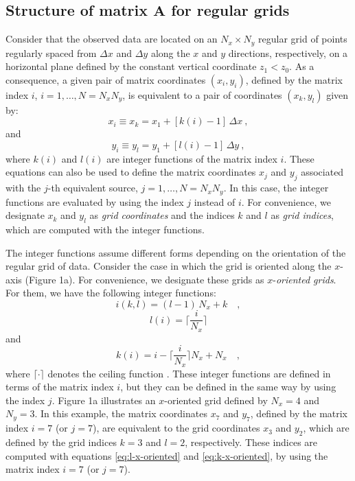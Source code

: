 \documentclass[manuscript,revised]{geophysics}
\begin{document}
\subsection{Structure of matrix $\mathbf{A}$ for regular grids}

Consider that the observed data are located on an $N_{x} \times N_{y}$ regular grid of
points regularly spaced from $\Delta x$ and $\Delta y$ along the $x$ and $y$ directions,
respectively, on a horizontal plane defined by the constant vertical coordinate $z_{1} < z_{0}$. 
As a consequence, a given pair of matrix coordinates $(x_{i}, y_{i})$, defined by the matrix index 
$i$, $i = 1, \dots, N = N_{x} N_{y}$, is equivalent to a pair of coordinates $(x_{k}, y_{l})$
given by:
\begin{equation}
x_{i} \equiv x_{k} = x_{1} + \left[ k(i) - 1 \right] \, \Delta x \: , 
\label{eq:xi}
\end{equation}
and
\begin{equation}
y_{i} \equiv y_{l} = y_{1} + \left[ l(i) - 1 \right] \, \Delta y \: ,
\label{eq:yi}
\end{equation}
where $k(i)$ and $l(i)$ are integer functions of the matrix index $i$.
These equations can also be used to define the matrix coordinates 
$x_{j}$ and $y_{j}$ associated with the $j$-th equivalent source,
$j = 1, \dots, N = N_{x}N_{y}$. In this case, the integer functions
are evaluated by using the index $j$ instead of $i$.
For convenience, we designate $x_{k}$ and $y_{l}$ as \textit{grid coordinates}
and the indices $k$ and $l$ as \textit{grid indices}, which are computed with
the integer functions.

The integer functions assume different forms depending on the 
orientation of the regular grid of data.
Consider the case in which the grid is oriented along the
$x$-axis (Figure 1a). For convenience, we designate these grids as 
$x$-\textit{oriented grids}. For them, we have the following integer functions:
\begin{equation}
i(k, l) = (l - 1) \, N_{x} + k \quad ,
\label{eq:i-x-oriented}
\end{equation}
\begin{equation}
l(i) = \Bigg\lceil \frac{i}{N_{x}} \Bigg\rceil
\label{eq:l-x-oriented}
\end{equation}
and
\begin{equation}
k(i)  = i - \Bigg\lceil \frac{i}{N_{x}} \Bigg\rceil N_{x} + N_{x} \quad ,
\label{eq:k-x-oriented}
\end{equation}
where $\lceil \cdot \rceil$ denotes the ceiling function \citep[][ p. 67]{graham-etal1994}.
These integer functions are defined in terms of the matrix index $i$, but they can 
be defined in the same way by using the index $j$.
Figure 1a illustrates an $x$-oriented grid defined by $N_{x} = 4$ and $N_{y} = 3$.
In this example, the matrix coordinates $x_{7}$ and $y_{7}$, defined by the matrix index $i = 7$ (or $j = 7$), 
are equivalent to the grid coordinates $x_{3}$ and $y_{2}$, which are defined by the grid indices
$k = 3$ and $l = 2$, respectively. These indices are computed with equations \ref{eq:l-x-oriented}
and \ref{eq:k-x-oriented}, by using the matrix index $i = 7$ (or $j = 7$).
\end{document}
